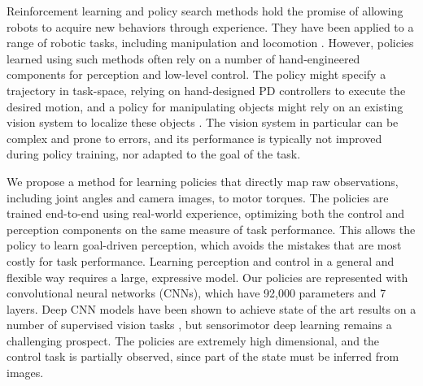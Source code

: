 \documentclass[final]{IEEEtran}
\begin{document}
Reinforcement learning and policy search methods hold the promise of allowing robots to acquire new behaviors through experience. They have been applied to a range of robotic tasks, including manipulation \cite{drf-lclcm-11,kop-rlarm-10} and locomotion \cite{emmnc-lcbbl-08,gpw-fbwrc-06,kp-pgrlf-04,tzs-spgrl-04}. However, policies learned using such methods often rely on a number of hand-engineered components for perception and low-level control. The policy might specify a trajectory in task-space, relying on hand-designed PD controllers to execute the desired motion, and a policy for manipulating objects might rely on an existing vision system to localize these objects \cite{phas-lgmsl-09}. The vision system in particular can be complex and prone to errors, and its performance is typically not improved during policy training, nor adapted to the goal of the task.

We propose a method for learning policies that directly map raw observations, including joint angles and camera images, to motor torques. The policies are trained end-to-end using real-world experience, optimizing both the control and perception components on the same measure of task performance. This allows the policy to learn goal-driven perception, which avoids the mistakes that are most costly for task performance. Learning perception and control in a general and flexible way requires a large, expressive model. Our policies are represented with convolutional neural networks (CNNs), which have 92,000 parameters and 7 layers. Deep CNN models have been shown to achieve state of the art results on a number of supervised vision tasks \cite{gddm-fhaod-13,ksh-incdc-12,tjlb-jcngm-14}, but sensorimotor deep learning remains a challenging prospect. The policies are extremely high dimensional, and the control task is partially observed, since part of the state must be inferred from images.
\end{document}
